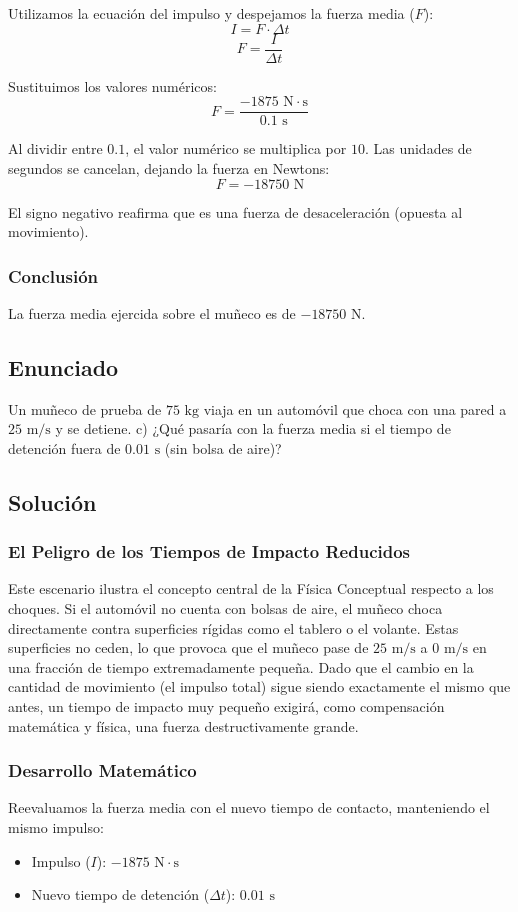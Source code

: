 \documentclass{article}
\begin{document}
Utilizamos la ecuación del impulso y despejamos la fuerza media ($F$):
$$I = F \cdot \Delta t$$
$$F = \frac{I}{\Delta t}$$

Sustituimos los valores numéricos:
$$F = \frac{-1875 \text{ N}\cdot\text{s}}{0.1 \text{ s}}$$

Al dividir entre $0.1$, el valor numérico se multiplica por $10$. Las unidades de segundos se cancelan, dejando la fuerza en Newtons:
$$F = -18750 \text{ N}$$

El signo negativo reafirma que es una fuerza de desaceleración (opuesta al movimiento).

\subsubsection*{Conclusión}
La fuerza media ejercida sobre el muñeco es de $-18750 \text{ N}$.

\newpage

\subsection*{Enunciado}
Un muñeco de prueba de $75 \text{ kg}$ viaja en un automóvil que choca con una pared a $25 \text{ m/s}$ y se detiene. 
c) ¿Qué pasaría con la fuerza media si el tiempo de detención fuera de $0.01 \text{ s}$ (sin bolsa de aire)?

\subsection*{Solución}

\subsubsection*{El Peligro de los Tiempos de Impacto Reducidos}
Este escenario ilustra el concepto central de la Física Conceptual respecto a los choques. Si el automóvil no cuenta con bolsas de aire, el muñeco choca directamente contra superficies rígidas como el tablero o el volante. Estas superficies no ceden, lo que provoca que el muñeco pase de $25 \text{ m/s}$ a $0 \text{ m/s}$ en una fracción de tiempo extremadamente pequeña. Dado que el cambio en la cantidad de movimiento (el impulso total) sigue siendo exactamente el mismo que antes, un tiempo de impacto muy pequeño exigirá, como compensación matemática y física, una fuerza destructivamente grande.

\subsubsection*{Desarrollo Matemático}
Reevaluamos la fuerza media con el nuevo tiempo de contacto, manteniendo el mismo impulso:
\begin{itemize}
    \item Impulso ($I$): $-1875 \text{ N}\cdot\text{s}$
    \item Nuevo tiempo de detención ($\Delta t$): $0.01 \text{ s}$
\end{itemize}
\end{document}
